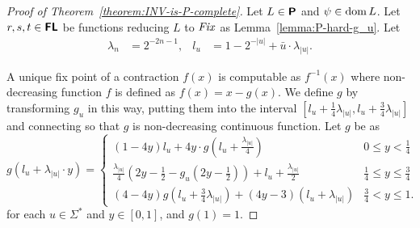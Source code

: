 \documentclass{article}
\theoremstyle{definition}
\theoremstyle{remark}
\begin{document}
\begin{proof}
[Proof of Theorem~\ref{theorem:INV-is-P-complete}]
Let $L \in \text{\bfseries \sffamily \upshape P}$ and $\psi \in \mathop{\rm dom} L$.
Let $r, s, t \in \text{\bfseries \sffamily \upshape FL}$ be functions reducing $L$ to $\mathit{Fix}$
as Lemma~\ref{lemma:P-hard-g_u}.
Let
\begin{align}
 \lambda_n &= 2^{-2n-1},
 &
 l_u & = 1 - 2^{-|u|} + \bar u \cdot \lambda_{|u|}.
\end{align}

A unique fix point of a contraction $f(x)$ is computable as
$f^{-1}(x)$ where non-decreasing function $f$ is defined as $f(x) = x - g(x)$.
We define $g$ by transforming $g_u$ in this way, putting them into the
interval $[l_u + \frac{1}{4}\lambda_{|u|}, l_u + \frac{3}{4}\lambda_{|u|}]$
and connecting so that $g$ is non-decreasing continuous function.
Let $g$ be as
\begin{equation}
\label{equation: definition of g}
 g \left( l_u + \lambda_{|u|} \cdot y \right) =
 \begin{cases}
  (1-4y)l_u + 4y \cdot g \left( l_u + \frac{\lambda_{|u|}}{4} \right) 
  &
  0 \le y < \frac 1 4
  \\
  \frac{\lambda_{|u|}}{4} \left( 2y - \frac 1 2 - g_u \left( 2y - \frac 1 2 \right) \right) + l_u + \frac{\lambda_{|u|}}{2}
  &
  \frac 1 4 \le y \le \frac 3 4
  \\
  (4-4y) g \left( l_u + \frac 3 4 \lambda_{|u|} \right) + (4y-3)(l_u + \lambda_{|u|})
  &
  \frac 3 4 < y \le 1.
 \end{cases}
\end{equation}
for each $u \in \Sigma^*$ and $y \in [0,1]$, and $g(1) = 1$.


\end{proof}
\end{document}
